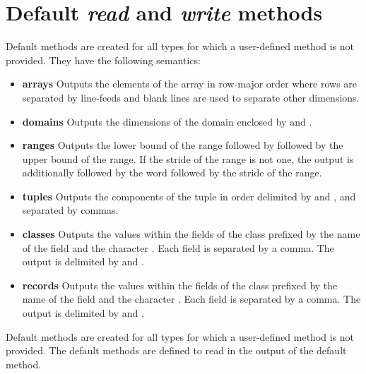\section{Default {\em read} and {\em write} methods}


Default  methods are created for all types for which a user-defined
 method is not provided.  They have the following semantics:
\begin{itemize}
\item
{\bf arrays} Outputs the elements of the array in row-major order
where rows are separated by line-feeds and blank lines are used to
separate other dimensions.
\item
{\bf domains} Outputs the dimensions of the domain enclosed
by \chpl{[} and \chpl{]}.
\item
{\bf ranges} Outputs the lower bound of the range followed
by  followed by the upper bound of the range.  If the stride
of the range is not one, the output is additionally followed by the
word  followed by the stride of the range.
\item
{\bf tuples} Outputs the components of the tuple in order delimited
by \chpl{(} and \chpl{)}, and separated by commas.
\item
{\bf classes} Outputs the values within the fields of the class
prefixed by the name of the field and the character \chpl{=}.  Each
field is separated by a comma.  The output is delimited by \chpl{\{}
and \chpl{\}}.
\item
{\bf records} Outputs the values within the fields of the class
prefixed by the name of the field and the character \chpl{=}.  Each
field is separated by a comma.  The output is delimited by \chpl{(}
and \chpl{)}.
\end{itemize}

Default  methods are created for all types for which a user-defined
 method is not provided.  The default  methods are
defined to read in the output of the default  method.
